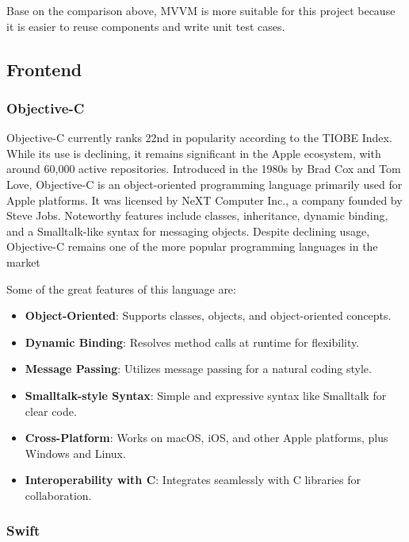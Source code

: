 Base on the comparison above, MVVM is more suitable for this project because it is easier to reuse components and write unit test cases.

\subsection{Frontend}

\subsubsection{Objective-C}

Objective-C currently ranks 22nd in popularity according to the TIOBE Index. While its use is declining, it remains significant in the Apple ecosystem, with around 60,000 active repositories. Introduced in the 1980s by Brad Cox and Tom Love, Objective-C is an object-oriented programming language primarily used for Apple platforms. It was licensed by NeXT Computer Inc., a company founded by Steve Jobs. Noteworthy features include classes, inheritance, dynamic binding, and a Smalltalk-like syntax for messaging objects. Despite declining usage, Objective-C remains one of the more popular programming languages in the market

Some of the great features of this language are:

\begin{itemize}
    \item \textbf{Object-Oriented}: Supports classes, objects, and object-oriented concepts.
    \item \textbf{Dynamic Binding}: Resolves method calls at runtime for flexibility.
    \item \textbf{Message Passing}: Utilizes message passing for a natural coding style.
    \item \textbf{Smalltalk-style Syntax}: Simple and expressive syntax like Smalltalk for clear code.
    \item \textbf{Cross-Platform}: Works on macOS, iOS, and other Apple platforms, plus Windows and Linux.
    \item \textbf{Interoperability with C}: Integrates seamlessly with C libraries for collaboration.
\end{itemize}

\subsubsection{Swift}

